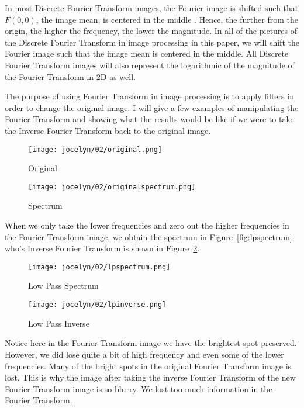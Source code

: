 \documentclass [../article.tex]{subfiles}
\begin{document}
  In most Discrete Fourier Transform images, the Fourier image is
  shifted such that $F(0,0)$, the image mean, is centered in the
  middle \cite{fisher_perkins_walker_wolfart_2003}. Hence, the
  further from the origin, the higher the frequency, the lower the magnitude.  In all of the pictures of the Discrete Fourier Transform in image processing in this paper, we will shift the Fourier image such that the image mean is centered in the middle.  All Discrete Fourier Transform images will also represent the logarithmic of the magnitude of the Fourier Transform in 2D as well.

  The purpose of using Fourier Transform in image processing is to
  apply filters in order to change the original image.  I will give
  a few examples of manipulating the Fourier Transform and  showing
  what the results would be like if we were to take the Inverse
  Fourier Transform back to the original image.
  \begin{figure}[htbp]
      \texttt{[image: jocelyn/02/original.png]}
      \caption{Original}
      \label{fig:original2}
    \endminipage\hfill
      \texttt{[image: jocelyn/02/originalspectrum.png]}
      \caption{Spectrum}
      \label{fig:spectrum2}
    \endminipage
  \end{figure}

  When we only take the lower frequencies and zero out the higher
  frequencies in the Fourier Transform image, we obtain the spectrum
  in Figure~\ref{fig:lpspectrum} who's Inverse Fourier Transform
  is shown in Figure~\ref{fig:lpinverse}.
  \begin{figure}[htbp]
      \texttt{[image: jocelyn/02/lpspectrum.png]}
      \caption{Low Pass Spectrum}
      \label{fig:lpspectrum}
    \endminipage\hfill
      \texttt{[image: jocelyn/02/lpinverse.png]}
      \caption{Low Pass Inverse}
      \label{fig:lpinverse}
    \endminipage
  \end{figure}
  Notice here in the Fourier Transform image we have the brightest
  spot preserved.  However, we did lose quite a bit of high
  frequency and even some of the lower frequencies.  Many of the
  bright spots in the original Fourier Transform image is lost.
  This is why the image after taking the inverse Fourier Transform
  of the new Fourier Transform image is so blurry.  We lost too much
  information in the Fourier Transform.
\end{document}
